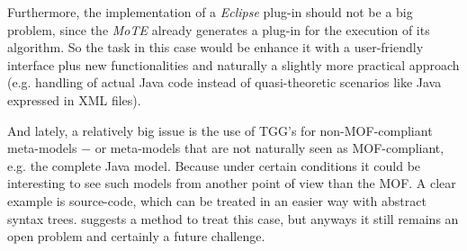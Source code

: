 \documentclass[tuberlin,cic,tc,english,noabntcite]{iiufrgs}
\begin{document}
Furthermore, the implementation of a \emph{Eclipse} plug-in should not be a big problem, since the \emph{MoTE} already generates a plug-in for the execution of its algorithm. So the task in this case would be enhance it with a user-friendly interface plus new functionalities and naturally a slightly more practical approach (e.g. handling of actual Java code instead of quasi-theoretic scenarios like Java expressed in XML files).

And lately, a relatively big issue is the use of TGG's for non-MOF-compliant meta-models $-$ or meta-models that are not naturally seen as MOF-compliant, e.g. the complete Java model. Because under certain conditions it could be interesting to see such models from another point of view than the MOF. A clear example is source-code, which can be treated in an easier way with abstract syntax trees. \citet{angyal2008novel} suggests a method to treat this case, but anyways it still remains an open problem and certainly a future challenge.






\end{document}
